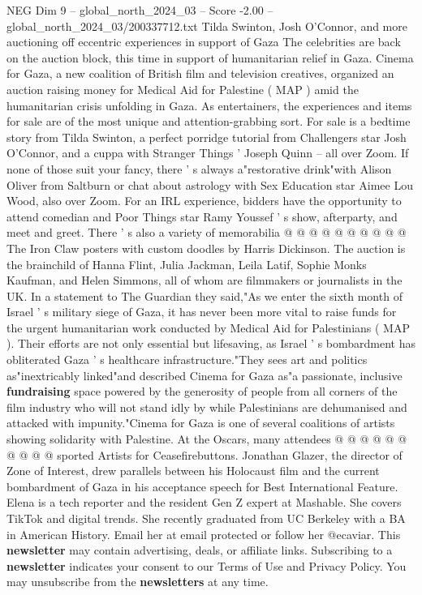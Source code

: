 \begin{textsample}{NEG Dim 9 – global\_north\_2024\_03 – Score -2.00 – global\_north\_2024\_03/200337712.txt}  \label{ex:f9_neg_184}
Tilda Swinton, Josh O'Connor, and more auctioning off eccentric experiences in support of Gaza The celebrities are back on the auction block, this time in support of humanitarian relief in Gaza.
Cinema for Gaza, a new coalition of British film and television creatives, organized an auction raising money for Medical Aid for Palestine ( MAP ) amid the humanitarian crisis unfolding in Gaza.
As entertainers, the experiences and items for sale are of the most unique and attention-grabbing sort.
For sale is a bedtime story from Tilda Swinton, a perfect porridge tutorial from Challengers star Josh O'Connor, and a cuppa with Stranger Things ' Joseph Quinn -- all over Zoom.
If none of those suit your fancy, there ' s always a"restorative drink"with Alison Oliver from Saltburn or chat about astrology with Sex Education star Aimee Lou Wood, also over Zoom.
For an IRL experience, bidders have the opportunity to attend comedian and Poor Things star Ramy Youssef ' s show, afterparty, and meet and greet.
There ' s also a variety of memorabilia @ @ @ @ @ @ @ @ @ @ The Iron Claw posters with custom doodles by Harris Dickinson.
The auction is the brainchild of Hanna Flint, Julia Jackman, Leila Latif, Sophie Monks Kaufman, and Helen Simmons, all of whom are filmmakers or journalists in the UK.
In a statement to The Guardian they said,"As we enter the sixth month of Israel ' s military siege of Gaza, it has never been more vital to raise funds for the urgent humanitarian work conducted by Medical Aid for Palestinians ( MAP ).
Their efforts are not only essential but lifesaving, as Israel ' s bombardment has obliterated Gaza ' s healthcare infrastructure."They sees art and politics as"inextricably linked"and described Cinema for Gaza as"a passionate, inclusive \textbf{fundraising} space powered by the generosity of people from all corners of the film industry who will not stand idly by while Palestinians are dehumanised and attacked with impunity."Cinema for Gaza is one of several coalitions of artists showing solidarity with Palestine.
At the Oscars, many attendees @ @ @ @ @ @ @ @ @ @ sported Artists for Ceasefirebuttons.
Jonathan Glazer, the director of Zone of Interest, drew parallels between his Holocaust film and the current bombardment of Gaza in his acceptance speech for Best International Feature.
Elena is a tech reporter and the resident Gen Z expert at Mashable.
She covers TikTok and digital trends.
She recently graduated from UC Berkeley with a BA in American History.
Email her at email protected or follow her @ecaviar.
This \textbf{newsletter} may contain advertising, deals, or affiliate links.
Subscribing to a \textbf{newsletter} indicates your consent to our Terms of Use and Privacy Policy.
You may unsubscribe from the \textbf{newsletters} at any time.

\end{textsample}
